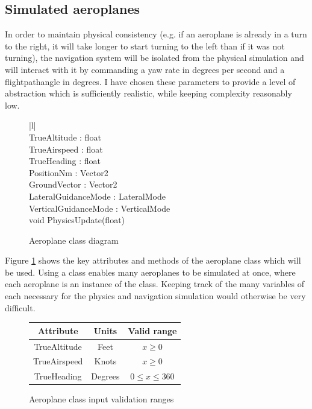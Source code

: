\documentclass{article}
\begin{document}
\subsection{Simulated aeroplanes}
In order to maintain physical consistency (e.g. if an aeroplane is already in a turn to the right, it will take longer to start turning to the left than if it was not turning), the navigation system will be isolated from the physical simulation and will interact with it by commanding a yaw rate in degrees per second and a \gls{flightpathangle} in degrees.
I have chosen these parameters to provide a level of abstraction which is sufficiently realistic, while keeping complexity reasonably low.

\begin{figure}[H]
\centering
\begin{tabular}{ |l| } 
\hline
{} \\
\hline
TrueAltitude : float \\
TrueAirspeed : float \\
TrueHeading : float \\
PositionNm : Vector2 \\
GroundVector : Vector2 \\
LateralGuidanceMode : LateralMode \\
VerticalGuidanceMode : VerticalMode \\
\hline
void PhysicsUpdate(float) \\
\hline
\end{tabular}
\caption{\label{fig:aeroplaneclass}Aeroplane class diagram}
\end{figure}

Figure \ref{fig:aeroplaneclass} shows the key attributes and methods of the aeroplane class which will be used.
Using a class enables many aeroplanes to be simulated at once, where each aeroplane is an instance of the class.
Keeping track of the many variables of each necessary for the physics and navigation simulation would otherwise be very difficult.

\begin{figure}[H]
\centering
\begin{tabular}{ |c|c|c| }
\hline
Attribute & Units & Valid range \\
\hline
TrueAltitude & Feet & $x \geq 0$ \\
\hline
TrueAirspeed & Knots & $x \geq 0$ \\
\hline
TrueHeading & Degrees & $0 \leq x \leq 360$ \\
\hline
\end{tabular}
\caption{\label{fig:aeroplaneclassinputs}Aeroplane class input validation ranges}
\end{figure}
\end{document}
